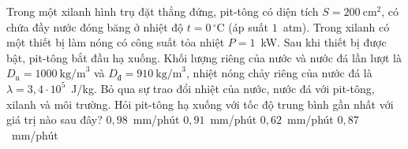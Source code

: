 	\begin{ex}%
		Trong một xilanh hình trụ đặt thẳng đứng, pit-tông có diện tích $S=200~\text{cm}^2$, có chứa đầy nước đóng băng ở nhiệt độ $t=0\,^\circ\text{C}$ (áp suất $1$~atm). Trong xilanh có một thiết bị làm nóng có công suất tỏa nhiệt $P=1$~kW. Sau khi thiết bị được bật, pit-tông bắt đầu hạ xuống. Khối lượng riêng của nước và nước đá lần lượt là $D_\text{n}=1000~\text{kg/m}^3$ và $D_\text{đ}=910~\text{kg/m}^3$, nhiệt nóng chảy riêng của nước đá là $\lambda=3{,}4\cdot 10^5$~J/kg. Bỏ qua sự trao đổi nhiệt của nước, nước đá với pit-tông, xilanh và môi trường. Hỏi pit-tông hạ xuống với tốc độ trung bình gần nhất với giá trị nào sau đây?
		\choice
		{$0{,}98$~mm/phút}
		{$0{,}91$~mm/phút}
		{$0{,}62$~mm/phút}
		{\True $0{,}87$~mm/phút}
	\end{ex}

